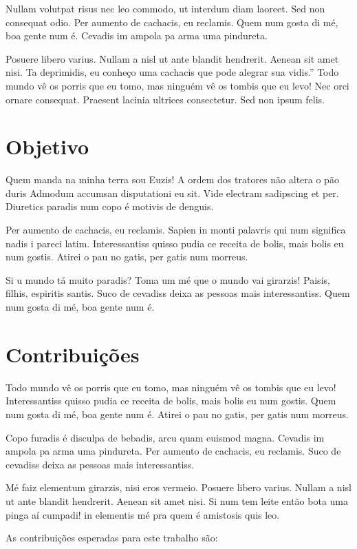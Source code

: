 Nullam volutpat risus nec leo commodo, ut interdum diam laoreet. Sed non consequat odio. Per aumento de cachacis, eu reclamis. Quem num gosta di mé, boa gente num é. Cevadis im ampola pa arma uma pindureta.

Posuere libero varius. Nullam a nisl ut ante blandit hendrerit. Aenean sit amet nisi. Ta deprimidis, eu conheço uma cachacis que pode alegrar sua vidis.” Todo mundo vê os porris que eu tomo, mas ninguém vê os tombis que eu levo! Nec orci ornare consequat. Praesent lacinia ultrices consectetur. Sed non ipsum felis. 

\section{Objetivo} \label{sec:obj}
Quem manda na minha terra sou Euzis! A ordem dos tratores não altera o pão duris Admodum accumsan disputationi eu sit. Vide electram sadipscing et per. Diuretics paradis num copo é motivis de denguis.

Per aumento de cachacis, eu reclamis. Sapien in monti palavris qui num significa nadis i pareci latim. Interessantiss quisso pudia ce receita de bolis, mais bolis eu num gostis. Atirei o pau no gatis, per gatis num morreus.

Si u mundo tá muito paradis? Toma um mé que o mundo vai girarzis! Paisis, filhis, espiritis santis. Suco de cevadiss deixa as pessoas mais interessantiss. Quem num gosta di mé, boa gente num é. 

\section{Contribuições} \label{sec:contrib}
Todo mundo vê os porris que eu tomo, mas ninguém vê os tombis que eu levo! Interessantiss quisso pudia ce receita de bolis, mais bolis eu num gostis. Quem num gosta di mé, boa gente num é. Atirei o pau no gatis, per gatis num morreus.

Copo furadis é disculpa de bebadis, arcu quam euismod magna. Cevadis im ampola pa arma uma pindureta. Per aumento de cachacis, eu reclamis. Suco de cevadiss deixa as pessoas mais interessantiss.

Mé faiz elementum girarzis, nisi eros vermeio. Posuere libero varius. Nullam a nisl ut ante blandit hendrerit. Aenean sit amet nisi. Si num tem leite então bota uma pinga aí cumpadi! in elementis mé pra quem é amistosis quis leo. 

As contribui\c{c}\~{o}es esperadas para este trabalho s\~{a}o:


